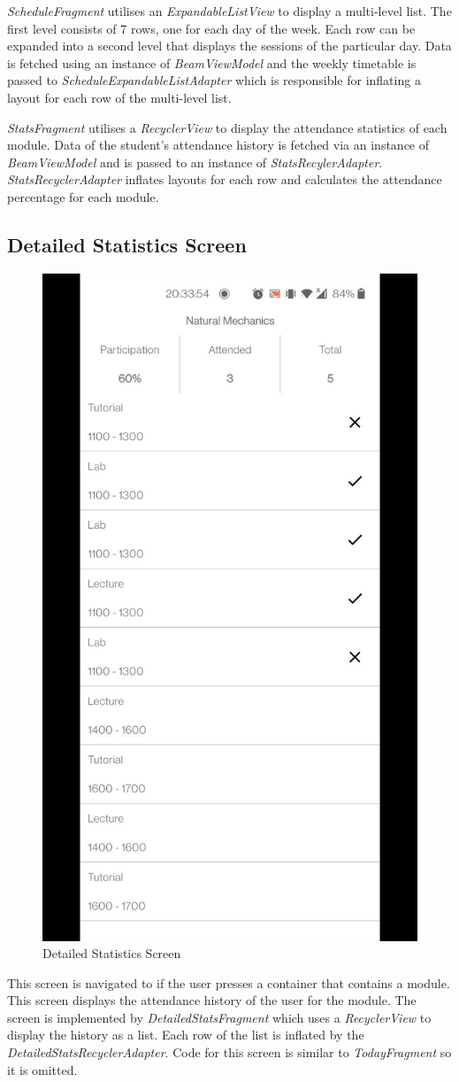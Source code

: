 \documentclass[../report.tex]{subfiles}
\begin{document}




\textit{ScheduleFragment} utilises an \textit{ExpandableListView} to display a multi-level list. The first level consists of 7 rows, one for each day of the week. Each row can be expanded into a second level that displays the sessions of the particular day. Data is fetched using an instance of \textit{BeamViewModel} and the weekly timetable is passed to \textit{ScheduleExpandableListAdapter} which is responsible for inflating a layout for each row of the multi-level list.

\textit{StatsFragment} utilises a \textit{RecyclerView} to display the attendance statistics of each module. Data of the student’s attendance history is fetched via an instance of \textit{BeamViewModel} and is passed to an instance of \textit{StatsRecylerAdapter}. \textit{StatsRecyclerAdapter} inflates layouts for each row and calculates the attendance percentage for each module.

\subsection{Detailed Statistics Screen}
\begin{figure}[H]
	\centering
	\includegraphics[width=.28\linewidth]{../images/07/02-app-dstats.jpg}
	\caption{Detailed Statistics Screen}
	\label{fig:app-dstats-screen}
\end{figure}

This screen is navigated to if the user presses a container that contains a module. This screen displays the attendance history of the user for the module. The screen is implemented by \textit{DetailedStatsFragment} which uses a \textit{RecyclerView} to display the history as a list. Each row of the list is inflated by the \textit{DetailedStatsRecyclerAdapter}. Code for this screen is similar to \textit{TodayFragment} so it is omitted.
\end{document}
